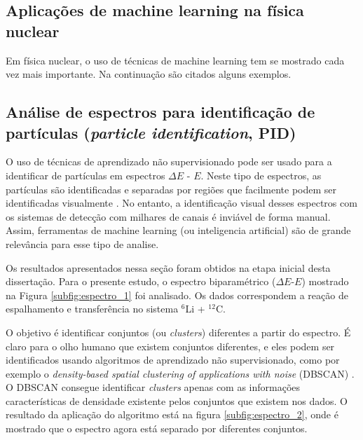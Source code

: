 \documentclass[a4paper,12pt,oneside]{book}
\begin{document}

\begin{appendices}


\chapter{Aplicações de machine learning na física nuclear} \label{appendix:ml_nuclear}

\par Em física nuclear, o uso de técnicas de machine learning tem se mostrado cada vez mais importante. Na continuação são citados alguns exemplos.

\section{Análise de espectros para identificação de partículas (\textit{particle identification}, PID)}

\par O uso de técnicas de aprendizado não supervisionado pode ser usado para a identificar de partículas em espectros $\Delta E$ - $E$. Neste tipo de espectros, as partículas são identificadas e separadas por regiões que facilmente podem ser identificadas visualmente \cite{DETC_TELE}. No entanto, a identificação visual desses espectros com os sistemas de detecção com milhares de canais é inviável de forma manual. Assim, ferramentas de machine learning (ou inteligencia artificial) são de grande relevância para esse tipo de analise.

Os resultados apresentados nessa seção foram obtidos na etapa inicial desta dissertação. Para o presente estudo, o espectro biparamétrico ($\Delta E$-$E$) mostrado na Figura \ref{subfig:espectro_1} foi analisado. Os dados correspondem a reação de espalhamento e transferência no sistema $^{6}$Li + $^{12}$C.



\par O objetivo é identificar conjuntos (ou \textit{clusters}) diferentes a partir do espectro. É claro para o olho humano que existem conjuntos diferentes, e eles podem ser identificados usando algoritmos de aprendizado não supervisionado, como por exemplo o \textit{density-based spatial clustering of applications with noise} (DBSCAN) \cite{dbscan}. O DBSCAN consegue identificar \textit{clusters} apenas com as informações características de densidade existente pelos conjuntos que existem nos dados. O resultado da aplicação do algoritmo está na figura \ref{subfig:espectro_2}, onde é mostrado que o espectro agora está separado por diferentes conjuntos.


\end{appendices}
\end{document}

